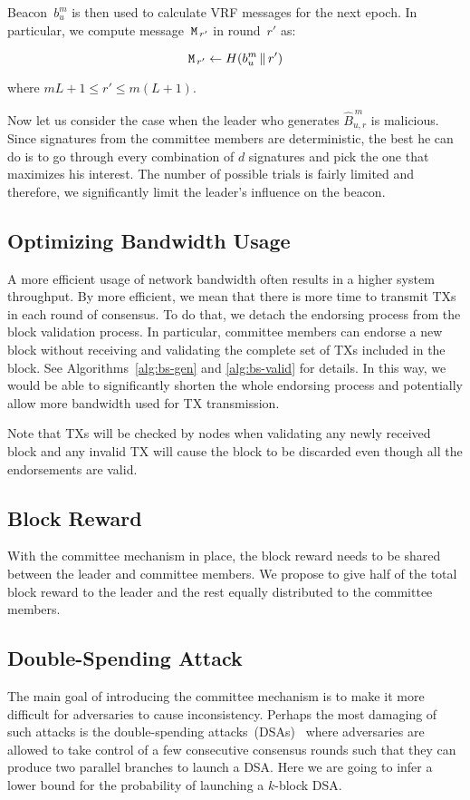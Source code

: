 \documentclass{article}
\begin{document}
Beacon~$b_u^m$ is then used to calculate VRF messages for the next epoch. In particular, we compute message~${\tt M}_{\,r'}$ in round~$r'$ as:

\begin{equation}
    {\tt M}_{\,r'} \leftarrow H(b_u^m\,\|\,r')
\end{equation}

where $mL+1\leq r'\leq m(L+1)$.

Now let us consider the case when the leader who generates $\hat{B}_{u,r}^{\,m}$ is malicious. Since signatures from the committee members are deterministic, the best he can do is to go through every combination of $d$ signatures and pick the one that maximizes his interest. The number of possible trials is fairly limited and therefore, we significantly limit the leader's influence on the beacon.

\subsection{Optimizing Bandwidth Usage}
A more efficient usage of network bandwidth often results in a higher system throughput. By more efficient, we mean that there is more time to transmit TXs in each round of consensus. To do that, we detach the endorsing process from the block validation process. In particular, committee members can endorse a new block without receiving and validating the complete set of TXs included in the block. See Algorithms~\ref{alg:bs-gen} and \ref{alg:bs-valid} for details. In this way, we would be able to significantly shorten the whole endorsing process and potentially allow more bandwidth used for TX transmission. 

Note that TXs will be checked by nodes when validating any newly received block and any invalid TX will cause the block to be discarded even though all the endorsements are valid. 

\subsection{Block Reward}
With the committee mechanism in place, the block reward needs to be shared between the leader and committee members. We propose to give half of the total block reward to the leader and the rest equally distributed to the committee members.

\subsection{Double-Spending Attack}
The main goal of introducing the committee mechanism is to make it more difficult for adversaries to cause inconsistency. Perhaps the most damaging of such attacks is the double-spending attacks~(DSAs)~\cite{Sat08} where adversaries are allowed to take control of a few consecutive consensus rounds such that they can produce two parallel branches to launch a DSA. Here we are going to infer a lower bound for the probability of launching a $k$-block DSA.
\end{document}
